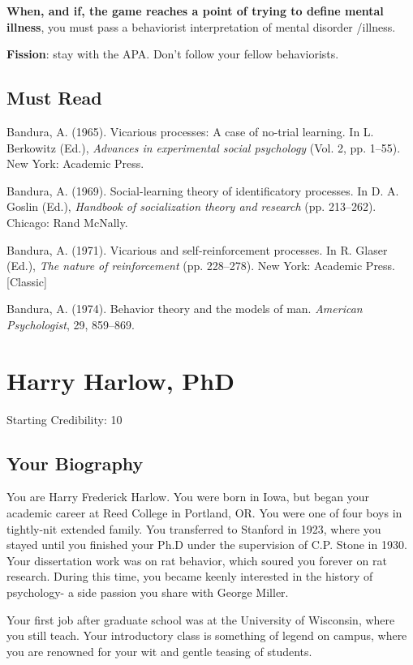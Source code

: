 \begin{refsection}
\textbf{When, and if, the game reaches a point of trying to define mental illness}, you must pass a behaviorist interpretation of mental disorder \slash  illness.

\textbf{Fission}: stay with the APA. Don't follow your fellow behaviorists.

\section{Must Read}
\label{mustread}

Bandura, A. (1965). Vicarious processes: A case of no-trial learning. In L. Berkowitz (Ed.), \emph{Advances in experimental social psychology} (Vol. 2, pp. 1--55). New York: Academic Press.

Bandura, A. (1969). Social-learning theory of identificatory processes. In D. A. Goslin (Ed.), \emph{Handbook of socialization theory and research} (pp. 213--262). Chicago: Rand McNally.

Bandura, A. (1971). Vicarious and self-reinforcement processes. In R. Glaser (Ed.), \emph{The nature of reinforcement} (pp. 228--278). New York: Academic Press. [Classic]

Bandura, A. (1974). Behavior theory and the models of man. \emph{American Psychologist}, 29, 859--869.

\chapter{Harry Harlow, PhD}
\label{harryharlowphd}

Starting Credibility: 10

\section{Your Biography}
\label{yourbiography}

You are Harry Frederick Harlow. You were born in Iowa, but began your academic career at Reed College in Portland, OR. You were one of four boys in tightly-nit extended family. You transferred to Stanford in 1923, where you stayed until you finished your Ph.D under the supervision of C.P. Stone in 1930. Your dissertation work was on rat behavior, which soured you forever on rat research. During this time, you became keenly interested in the history of psychology- a side passion you share with George Miller.

Your first job after graduate school was at the University of Wisconsin, where you still teach. Your introductory class is something of legend on campus, where you are renowned for your wit and gentle teasing of students.


\end{refsection}
